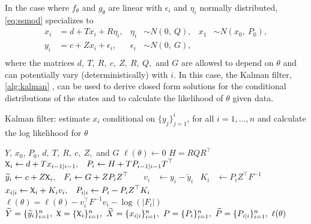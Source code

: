 \documentclass[12pt]{article}
\DeclareRobustCommand{\varx}{{\mathpalette\irchi\relax}}
\newcommand{\irchi}[2]{\protect\raisebox{\depth}{$#1\upchi$}}
\begin{document}
In the case where $f_\theta$ and $g_\theta$ are linear with $\epsilon_i$ and
$\eta_i$ normally distributed, \eqref{eq:ssmod} specializes to
\begin{equation}
  \begin{aligned}
    x_{i}&= d+T x_i + R\eta_{i}, 
    & \eta_i &\sim N(0,\ Q),     
    &x_1 &\sim N(x_0,\ P_0),\\
    y_i&= c + Z x_i + \epsilon_i,     
    & \epsilon_i &\sim N(0,\ G), \\
  \end{aligned}
  \label{eq:lgmod}
\end{equation}
where the matrices $d,\ T,\ R,\ c,\ Z,\ R,\ Q,$ and $G$ are allowed to depend
on $\theta$ and can potentially vary (deterministically) with $i$. In this case,
the Kalman filter, \autoref{alg:kalman} \citep[see e.g.][]{Kalman1960,Harvey1990},
can be used to derive closed form 
solutions for the conditional
distributions of the states and to calculate the likelihood of $\theta$
given data. 
\begin{algorithm}[t!]
  \begin{singlespace}
  \caption{Kalman filter: estimate $x_i$ conditional on
    $\{y_j\}_{j=1}^i$, for all $i=1,\ldots,n$ and calculate the log likelihood
    for $\theta$\label{alg:kalman}}
  \begin{algorithmic}
     $Y$, $x_0$, $P_0$, $d,\ T,\ R,\ c,\ Z,$ and $G$
    \STATE $\ell(\theta) \leftarrow 0$ 
    \STATE $H = RQR^\top$ 
    \STATE $\begin{aligned}\varx_{i}
      &\leftarrow d + T x_{i-1|i-1}, & P_i &\leftarrow H + T P_{i-1|i-1}
      T^\top\end{aligned}$ 
    \STATE $\begin{aligned}\widetilde{y}_i
      &\leftarrow c + Z \varx_i, & F_i &\leftarrow G + Z P_i
      Z^\top\end{aligned}$ 
    \STATE $\begin{aligned}v_i&\leftarrow y_i-\widetilde{y}_i& K_i&
      \leftarrow P_i Z^\top F^{-1}\end{aligned}$ 
    \STATE $\begin{aligned} x_{i|i}
      &\leftarrow \varx_i + K_i v_i, & P_{i|i} &\leftarrow P_i - P_iZ^\top
      K_i\end{aligned}$ 
    \STATE $\ell(\theta) = \ell(\theta) -v_i^\top F^{-1}v_i - \log(|F_i|)$
    \ENDFOR
    \RETURN $\widetilde{Y}=\{\widetilde{y}_i\}_{i=1}^n,\ \varx=\{\varx_i\}_{i=1}^n,\
    \widetilde{X}=\{x_{i|i}\}_{i=1}^n,\ P=\{P_i\}_{i=1}^n,\
    \widetilde{P}=\{P_{i|i}\}_{i=1}^n,\ \ell(\theta)$
  \end{algorithmic}
\end{singlespace}
\end{algorithm}
\end{document}
